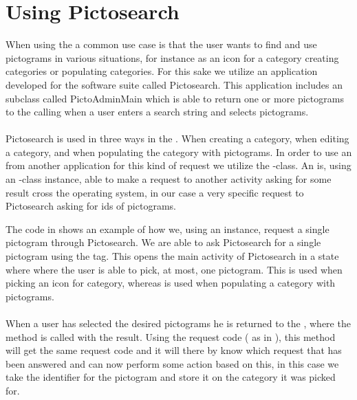 
\section{Using Pictosearch}
\label{sec:using_pictosearch}


When using the \ct a common use case is that the user wants to find and use pictograms in various situations, for instance as an icon for a category creating categories or populating categories. For this sake we utilize an application developed for the \giraf software suite called Pictosearch. This application includes an  subclass called PictoAdminMain  which is able to return one or more pictograms to the calling  when a user enters a search string and selects pictograms. 
\\\\
Pictosearch is used in three ways in the \ct. When creating a category, when editing a category, and when populating the category with pictograms. In order to use an  from another application for this kind of request we utilize the -class. An  is, using an -class instance, able to make a request to another activity asking for some result cross the operating system, in our case a very specific request to Pictosearch asking for ids of pictograms. 



The code in  shows an example of how we, using an  instance, request a single pictogram through Pictosearch. We are able to ask Pictosearch for a single pictogram using the  tag. This opens the main activity of Pictosearch in a state where where the user is able to pick, at most, one pictogram. This is used when picking an icon for category, whereas  is used when populating a category with pictograms. 
\\\\
When a user has selected the desired pictograms he is returned to the \ct, where the method  is called with the result. Using the request code ( as in ), this method will get the same request code  and it will there by know which request that has been answered and can now perform some action based on this, in this case we take the identifier for the pictogram and store it on the category it was picked for.

